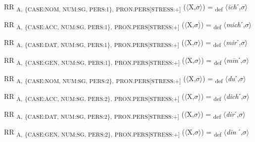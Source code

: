{\begin{exe}
 RR \textsubscript{A,} \textsubscript{\{CASE:NOM, NUM:SG, PERS:1\},} \textsubscript{PRON.PERS[STRESS:+]} ($\langle$X,$\sigma $$\rangle$) = \textsubscript{def} $\langle$\textit{ich}ˊ,$\sigma $$\rangle$
\end{exe}

\begin{exe}
 RR \textsubscript{A,} \textsubscript{\{CASE:ACC, NUM:SG, PERS:1\},} \textsubscript{PRON.PERS[STRESS:+]} ($\langle$X,$\sigma $$\rangle$) = \textsubscript{def} $\langle$\textit{mich}ˊ,$\sigma $$\rangle$
\end{exe}

\begin{exe}
 RR \textsubscript{A,} \textsubscript{\{CASE:DAT, NUM:SG, PERS:1\},} \textsubscript{PRON.PERS[STRESS:+]} ($\langle$X,$\sigma $$\rangle$) = \textsubscript{def} $\langle$\textit{mir}ˊ,$\sigma $$\rangle$
\end{exe}

\begin{exe}
 RR \textsubscript{A,} \textsubscript{\{CASE:GEN, NUM:SG, PERS:1\},} \textsubscript{PRON.PERS[STRESS:+]} ($\langle$X,$\sigma $$\rangle$) = \textsubscript{def} $\langle$\textit{m\=in}ˊ,$\sigma $$\rangle$
\end{exe}

\begin{exe}
 RR \textsubscript{A,} \textsubscript{\{CASE:NOM, NUM:SG, PERS:2\},} \textsubscript{PRON.PERS[STRESS:+]} ($\langle$X,$\sigma $$\rangle$) = \textsubscript{def} $\langle$\textit{du}ˊ,$\sigma $$\rangle$
\end{exe}

\begin{exe}
 RR \textsubscript{A,} \textsubscript{\{CASE:ACC, NUM:SG, PERS:2\},} \textsubscript{PRON.PERS[STRESS:+]} ($\langle$X,$\sigma $$\rangle$) = \textsubscript{def} $\langle$\textit{dich}ˊ,$\sigma $$\rangle$
\end{exe}

\begin{exe}
 RR \textsubscript{A,} \textsubscript{\{CASE:DAT, NUM:SG, PERS:2\},} \textsubscript{PRON.PERS[STRESS:+]} ($\langle$X,$\sigma $$\rangle$) = \textsubscript{def} $\langle$\textit{dir}ˊ,$\sigma $$\rangle$
\end{exe}

\begin{exe}
 RR \textsubscript{A,} \textsubscript{\{CASE:GEN, NUM:SG, PERS:2\},} \textsubscript{PRON.PERS[STRESS:+]} ($\langle$X,$\sigma $$\rangle$) = \textsubscript{def} $\langle$\textit{d\=in} ˊ,$\sigma $$\rangle$
\end{exe}

}
